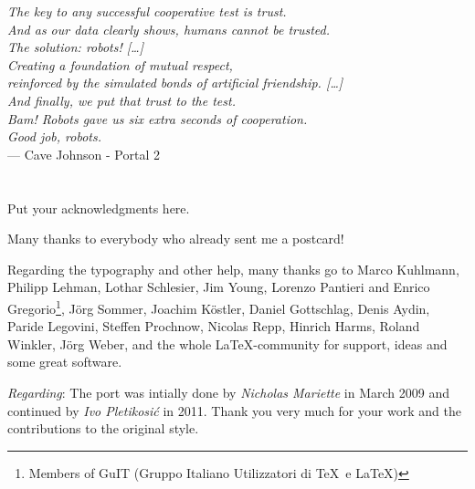 \pdfbookmark[1]{\acknowledgments}{\acknowledgments}

\begin{flushright}{\slshape
	The key to any successful cooperative test is trust. \\
	And as our data clearly shows, humans cannot be trusted. \\
	The solution: robots! […] \\
	Creating a foundation of mutual respect, \\
	reinforced by the simulated bonds of artificial friendship. […] \\
	And finally, we put that trust to the test. \\
	Bam! Robots gave us six extra seconds of cooperation. \\
	Good job, robots.} \\ \medskip
    --- Cave Johnson - Portal 2
\end{flushright}

\bigskip

\begingroup
\let\clearpage\relax
\let\cleardoublepage\relax
\let\cleardoublepage\relax
\chapter*{\acknowledgments}
Put your acknowledgments here.

Many thanks to everybody who already sent me a postcard!

Regarding the typography and other help, many thanks go to Marco 
Kuhlmann, Philipp Lehman, Lothar Schlesier, Jim Young, Lorenzo 
Pantieri and Enrico Gregorio\footnote{Members of GuIT (Gruppo 
Italiano Utilizzatori di \TeX\ e \LaTeX )}, J\"org Sommer, 
Joachim K\"ostler, Daniel Gottschlag, Denis Aydin, Paride 
Legovini, Steffen Prochnow, Nicolas Repp, Hinrich Harms, 
 Roland Winkler, J\"org Weber, 
 and the whole \LaTeX-community for support, ideas and 
 some great software.

\bigskip

\noindent\emph{Regarding}: The port was intially done by 
\emph{Nicholas Mariette} in March 2009 and continued by 
\emph{Ivo Pletikosi\'c} in 2011. Thank you very much for your 
work and the contributions to the original style.


\endgroup



